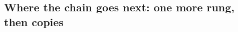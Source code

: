 %
%
%
%

\subsection{Where the chain goes next: one more rung, then copies}
\label{sec:wf-chain-type}


